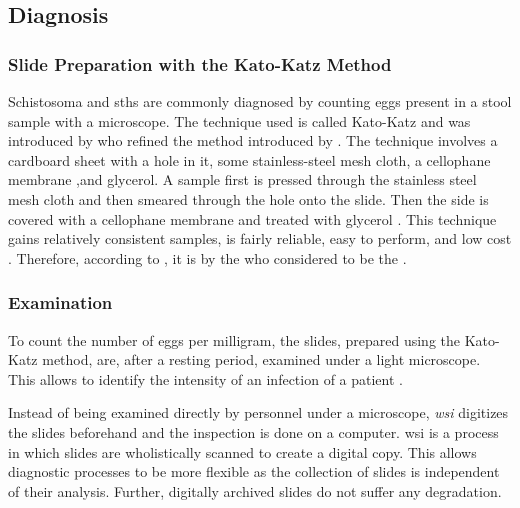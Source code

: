 \subsection{Diagnosis}
\label{sec:Foundations:NTDs:Diagnosis}


\subsubsection{Slide Preparation with the Kato-Katz Method}
\label{sec:Foundations:NTDs:Diagnosis:Preparation}

Schistosoma and \acp{sth} are commonly diagnosed by counting eggs present in a stool sample with a microscope. The technique used is called Kato-Katz \cite{nelwan2019schistosomiasis} and was introduced by \textcite{katz1972simple} who refined the method introduced by \citeauthor{kato1954comparative} \cite{kato1954comparative,kato1960correct}. The technique involves a cardboard sheet with a hole in it, some stainless-steel mesh cloth, a cellophane membrane ,and glycerol. A sample first is pressed through the stainless steel mesh cloth and then smeared through the hole onto the slide. Then the side is covered with a cellophane membrane and treated with glycerol \cite{mbongngwese2020diagnostic}. This technique gains relatively consistent samples, is fairly reliable, easy to perform, and low cost \cite{katz1972simple}. Therefore, according to \textcite{mbongngwese2020diagnostic}, it is by the \ac{who} considered to be the .

\subsubsection{Examination}
\label{sec:Foundations:NTDs:Diagnosis:Examination}

To count the number of eggs per milligram, the slides, prepared using the Kato-Katz method, are, after a resting period, examined under a light microscope. This allows to identify the intensity of an infection of a patient \cite{feasey2010neglected}.

Instead of being examined directly by personnel under a microscope, \emph{\acf{wsi}} digitizes the slides beforehand and the inspection is done on a computer. \Ac{wsi} \cite{ghaznavi2013digital, hanna2019whole, el-gabry2014wholeslide} is a process in which slides are wholistically scanned to create a digital copy. This allows diagnostic processes to be more flexible as the collection of slides is independent of their analysis. Further, digitally archived slides do not suffer any degradation. 

